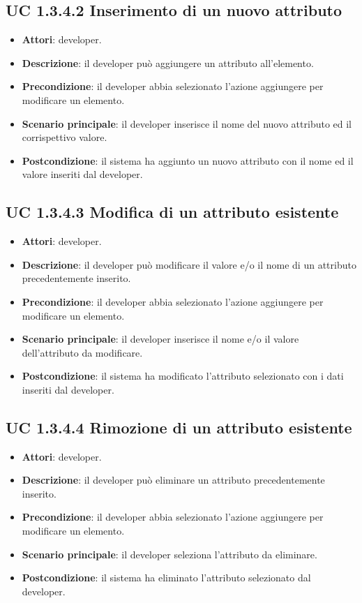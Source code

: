 	\subsection{UC 1.3.4.2 Inserimento di un nuovo attributo}
		\label{subsec:XEUC1.3.4.2}
		
		\begin{itemize}
			\item\textbf{Attori}: developer.
			\item\textbf{Descrizione}: il developer può aggiungere un attributo all'elemento.
			\item\textbf{Precondizione}: il developer abbia selezionato l'azione aggiungere per modificare un elemento.
			\item\textbf{Scenario principale}: il developer inserisce il nome del nuovo attributo ed il corrispettivo valore.
			\item\textbf{Postcondizione}: il sistema ha aggiunto un nuovo attributo con il nome ed il valore inseriti dal developer.
		\end{itemize}
		
	\subsection{UC 1.3.4.3 Modifica di un attributo esistente}
		\label{subsec:XEUC1.3.4.3}
		
		\begin{itemize}
			\item\textbf{Attori}: developer.
			\item\textbf{Descrizione}: il developer può modificare il valore e/o il nome di un attributo precedentemente inserito.
			\item\textbf{Precondizione}: il developer abbia selezionato l'azione aggiungere per modificare un elemento.
			\item\textbf{Scenario principale}: il developer inserisce il nome e/o il valore dell'attributo da modificare.
			\item\textbf{Postcondizione}: il sistema ha modificato l'attributo selezionato con i dati inseriti dal developer.
		\end{itemize}
		
	\subsection{UC 1.3.4.4 Rimozione di un attributo esistente}
		\label{subsec:XEUC1.3.4.4}
		
		\begin{itemize}
			\item\textbf{Attori}: developer.
			\item\textbf{Descrizione}: il developer può eliminare un attributo precedentemente inserito.
			\item\textbf{Precondizione}: il developer abbia selezionato l'azione aggiungere per modificare un elemento.
			\item\textbf{Scenario principale}: il developer seleziona l'attributo da eliminare.
			\item\textbf{Postcondizione}: il sistema ha eliminato l'attributo selezionato dal developer.
		\end{itemize}
		
